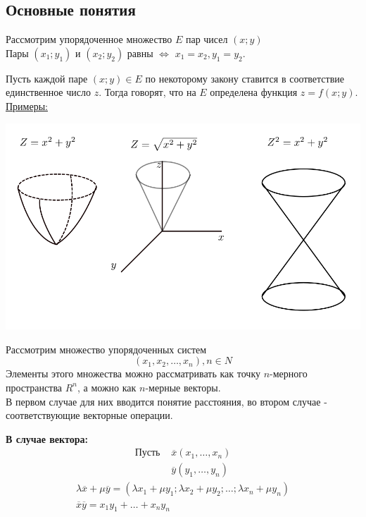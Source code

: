 \documentclass[12pt]{article}
\let\ORIincludegraphics\includegraphics
\renewcommand{\includegraphics}[2][]{\ORIincludegraphics[scale=0.65,#1]{#2}}
\begin{document}
    \subsection{Основные понятия}
    Рассмотрим упорядоченное множество $E$ пар чисел $(x; y)$\\
    Пары $(x_1; y_1)$ и $(x_2; y_2)$ равны $\Leftrightarrow$ $x_1 = x_2, y_1 = y_2$.\par\noindent
    Пусть каждой паре $(x; y) \in E$ по некоторому закону ставится в соответствие единственное число $z$. Тогда говорят, что на $E$ определена функция $z = f(x; y)$.\\
    \underline{Примеры:}
    \begin{center}
        \includegraphics{7.1.1.png}
    \end{center}
    Рассмотрим множество упорядоченных систем
    \[ (x_1, x_2, \dots, x_n), n \in N \]
    Элементы этого множества можно рассматривать как точку $n$-мерного пространства $R^n$, а можно как $n$-мерные векторы.\\
    В первом случае для них вводится понятие расстояния, во втором случае - соответствующие векторные операции.\par\noindent
    \textbf{В случае вектора:}
    \begin{align*}
        \text{Пусть }&\overline{x} (x_1, \dots, x_n)\\
        &\overline{y}(y_1,\dots,y_n)
    \end{align*}
    \begin{gather*}
        \lambda\overline{x} + \mu \overline{y} = (\lambda x_1 + \mu y_1; \lambda x_2 + \mu y_2; \dots; \lambda x_n + \mu y_n)\\
        \overline{x}\overline{y} = x_1y_1 + \dots + x_ny_n
    \end{gather*}
\end{document}
